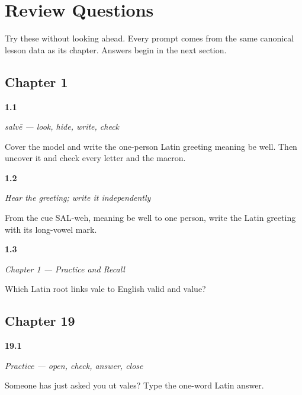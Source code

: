 
\chapter*{Review Questions}

Try these without looking ahead. Every prompt comes from the same canonical lesson data as its chapter. Answers begin in the next section.

\section*{Chapter 1}

\noindent\begin{minipage}[t]{\linewidth}
\raggedright
\hypertarget{review-LA-W01-salve-delayed-copy-check}{\textbf{1.1}} \emph{salvē — look, hide, write, check}\par
\small Cover the model and write the one-person Latin greeting meaning be well. Then uncover it and check every letter and the macron.
\end{minipage}\par\medskip

\noindent\begin{minipage}[t]{\linewidth}
\raggedright
\hypertarget{review-LA-W01-salve-dictation-check}{\textbf{1.2}} \emph{Hear the greeting; write it independently}\par
\small From the cue SAL-weh, meaning be well to one person, write the Latin greeting with its long-vowel mark.
\end{minipage}\par\medskip

\noindent\begin{minipage}[t]{\linewidth}
\raggedright
\hypertarget{review-LA-C01-practice-vale-root}{\textbf{1.3}} \emph{Chapter 1 — Practice and Recall}\par
\small Which Latin root links vale to English valid and value?
\end{minipage}\par\medskip

\section*{Chapter 19}

\noindent\begin{minipage}[t]{\linewidth}
\raggedright
\hypertarget{review-LA-C19-practice-answer-line}{\textbf{19.1}} \emph{Practice — open, check, answer, close}\par
\small Someone has just asked you ut vales? Type the one-word Latin answer.
\end{minipage}\par\medskip


